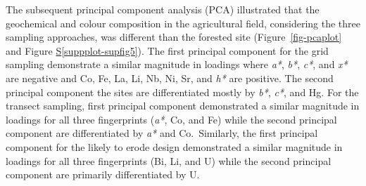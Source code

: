 \documentclass[
  number]{elsarticle}
\newcommand*\quartosuppplotref[1]{Figure \hyperref[#1]{S\ref{#1}}}
\begin{document}
\begin{table}
\begin{minipage}{\linewidth}


\end{minipage}%
\newline
\begin{minipage}{\linewidth}



\end{minipage}%

\end{table}%

The subsequent principal component analysis (PCA) illustrated that the
geochemical and colour composition in the agricultural field,
considering the three sampling approaches, was different than the
forested site (Figure~\ref{fig-pcaplot} and
\quartosuppplotref{suppplot-supfig5}). The first principal component for
the grid sampling demonstrate a similar magnitude in loadings where
\emph{a*}, \emph{b*}, \emph{c*}, and \emph{x*} are negative and Co, Fe,
La, Li, Nb, Ni, Sr, and \emph{h*} are positive. The second principal
component the sites are differentiated mostly by \emph{b*}, \emph{c*},
and Hg. For the transect sampling, first principal component
demonstrated a similar magnitude in loadings for all three fingerprints
(\emph{a*}, Co, and Fe) while the second principal component are
differentiated by \emph{a*} and Co.~Similarly, the first principal
component for the likely to erode design demonstrated a similar
magnitude in loadings for all three fingerprints (Bi, Li, and U) while
the second principal component are primarily differentiated by U.
\end{document}
